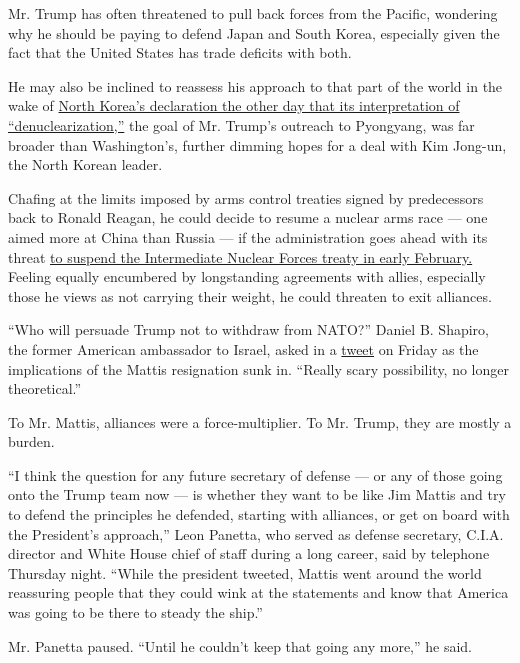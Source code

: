 Mr. Trump has often threatened to pull back forces from the Pacific,
wondering why he should be paying to defend Japan and South Korea,
especially given the fact that the United States has trade deficits with
both.

He may also be inclined to reassess his approach to that part of the
world in the wake of
\href{https://www.nytimes3xbfgragh.onion/2018/12/20/world/asia/north-korea-denuclearization.html?module=inline}{North
Korea's declaration the other day that its interpretation of
``denuclearization,''} the goal of Mr. Trump's outreach to Pyongyang,
was far broader than Washington's, further dimming hopes for a deal with
Kim Jong-un, the North Korean leader.

Chafing at the limits imposed by arms control treaties signed by
predecessors back to Ronald Reagan, he could decide to resume a nuclear
arms race --- one aimed more at China than Russia --- if the
administration goes ahead with its threat
\href{https://www.nytimes3xbfgragh.onion/2018/12/09/us/politics/trump-nuclear-arms-treaty-russia.html}{to
suspend the Intermediate Nuclear Forces treaty in early February.}
Feeling equally encumbered by longstanding agreements with allies,
especially those he views as not carrying their weight, he could
threaten to exit alliances.

``Who will persuade Trump not to withdraw from NATO?'' Daniel B.
Shapiro, the former American ambassador to Israel, asked in a
\href{https://twitter.com/DanielBShapiro/status/1076167846722523137}{tweet}
on Friday as the implications of the Mattis resignation sunk in.
``Really scary possibility, no longer theoretical.''

To Mr. Mattis, alliances were a force-multiplier. To Mr. Trump, they are
mostly a burden.

``I think the question for any future secretary of defense --- or any of
those going onto the Trump team now --- is whether they want to be like
Jim Mattis and try to defend the principles he defended, starting with
alliances, or get on board with the President's approach,'' Leon
Panetta, who served as defense secretary, C.I.A. director and White
House chief of staff during a long career, said by telephone Thursday
night. ``While the president tweeted, Mattis went around the world
reassuring people that they could wink at the statements and know that
America was going to be there to steady the ship.''

Mr. Panetta paused. ``Until he couldn't keep that going any more,'' he
said.

